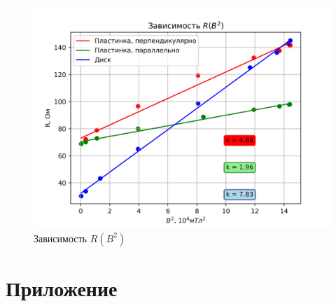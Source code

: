 \documentclass[a4paper, 12pt]{article}
\begin{document}
\begin{figure}[H]
    \centering
    \includegraphics[width=1\textwidth]{B2.png}
    \caption{Зависимость $R(B^2)$}
    \label{fig:b2}
\end{figure}



\section{Приложение}
\end{document}
